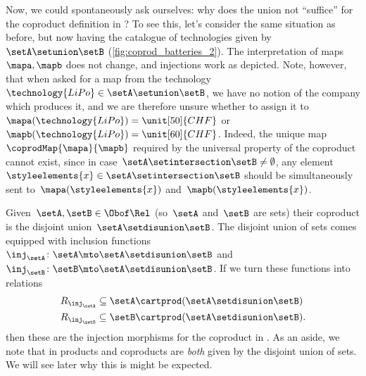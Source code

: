 \begin{example}
    Now, we could spontaneously ask ourselves: why does the union not ``suffice'' for the coproduct definition in \Set?
    To see this, let's consider the same situation as before, but now having the catalogue of technologies given by~$\setA\setunion \setB$ (\cref{fig:coprod_batteries_2}).
    The interpretation of maps~$\mapa,\mapb$ does not change, and injections work as depicted.
    Note, however, that when asked for a map from the technology~$\technology{LiPo}\in \setA\setunion \setB$, we have no notion of the company which produces it, and we are therefore unsure whether to assign it to~$\mapa(\technology{LiPo})=\unit[50]{CHF}$ or~$\mapb(\technology{LiPo})=\unit[60]{CHF}$.
    Indeed, the unique map~$\coprodMap{\mapa}{\mapb}$ required by the universal property of the coproduct cannot exist, since in case~$\setA\setintersection \setB\neq \emptyset$, any element~$\styleelements{x}\in \setA\setintersection \setB$ should be simultaneously sent to~$\mapa(\styleelements{x})$ and~$\mapb(\styleelements{x})$.

\end{example}


\begin{example}
    Given~$\setA,\setB\in \Obof\Rel$ (so~$\setA$ and~$\setB$ are sets) their coproduct is the disjoint union~$\setA \setdisunion \setB$.
    The disjoint union of sets comes equipped with inclusion functions~$\inj_\setA\colon \setA\mto \setA \setdisunion\setB$ and~$\inj_\setB\colon \setB\mto \setA \setdisunion\setB$.
    If we turn these functions into relations
    \begin{equation*}
        \begin{aligned}
            R_{\inj_\setA} & \subseteq \setA\cartprod (\setA \setdisunion\setB)  \\
            R_{\inj_\setB} & \subseteq \setB\cartprod (\setA \setdisunion\setB).
        \end{aligned}
    \end{equation*}
    then these are the injection morphisms for the coproduct in \Rel.
    As an aside, we note that in \Rel products and coproducts are \emph{both} given by the disjoint union of sets.
    We will see later why this is might be expected.
\end{example}

